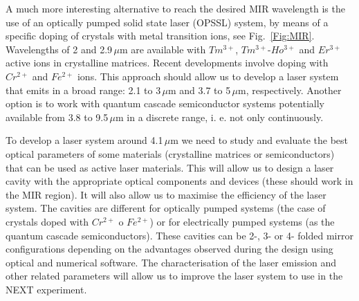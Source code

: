 A much more interesting alternative to reach the desired MIR wavelength is the use of an optically pumped solid state laser (OPSSL) system, by means of a specific doping of crystals with metal transition ions, see Fig.~\ref{Fig:MIR}. Wavelengths of 2 and 2.9\,$\mu$m are available with $Tm^{3+}$, $Tm^{3+}$-$Ho^{3+}$ and $Er^{3+}$ active ions in crystalline matrices. Recent developments involve doping with $Cr^{2+}$ and $Fe^{2+}$ ions. This approach should allow us to develop a laser system that emits in a broad range: 2.1 to 3\,$\mu$m and 3.7 to 5\,$\mu$m, respectively. Another option is to work with quantum cascade semiconductor systems potentially available from 3.8 to 9.5\,$\mu$m in a discrete range, i. e.  not only continuously. 

To develop a laser system around 4.1\,$\mu$m we need to study and evaluate the best optical parameters of some materials (crystalline matrices or semiconductors) that can be used as active laser materials.  This will allow us to design a laser cavity with the appropriate  optical components and devices (these should work in the MIR region). It will also allow us to maximise the efficiency of the laser system. The cavities are different for optically pumped systems (the case of crystals doped with $Cr^{2+}$ o $Fe^{2+}$) or for electrically pumped systems (as the quantum cascade semiconductors). These cavities can be 2-, 3- or 4- folded mirror configurations depending on the advantages observed during the design using optical and numerical software. The characterisation of the laser emission and other related parameters will allow us  to improve the laser system to use in the NEXT experiment. 